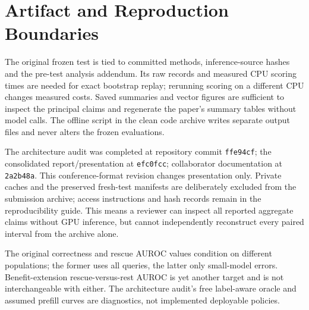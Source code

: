 \documentclass[11pt]{article}
\begin{document}
\section{Artifact and Reproduction Boundaries}
The original frozen test is tied to committed methods, inference-source hashes and the pre-test analysis addendum. Its raw records and measured CPU scoring times are needed for exact bootstrap replay; rerunning scoring on a different CPU changes measured costs. Saved summaries and vector figures are sufficient to inspect the principal claims and regenerate the paper's summary tables without model calls. The offline script in the clean code archive writes separate output files and never alters the frozen evaluations.

The architecture audit was completed at repository commit \texttt{ffe94cf}; the consolidated report/presentation at \texttt{efc0fcc}; collaborator documentation at \texttt{2a2b48a}. This conference-format revision changes presentation only. Private caches and the preserved fresh-test manifests are deliberately excluded from the submission archive; access instructions and hash records remain in the reproducibility guide. This means a reviewer can inspect all reported aggregate claims without GPU inference, but cannot independently reconstruct every paired interval from the archive alone.

The original correctness and rescue AUROC values condition on different populations; the former uses all queries, the latter only small-model errors. Benefit-extension rescue-versus-rest AUROC is yet another target and is not interchangeable with either. The architecture audit's free label-aware oracle and assumed prefill curves are diagnostics, not implemented deployable policies.
\end{document}
